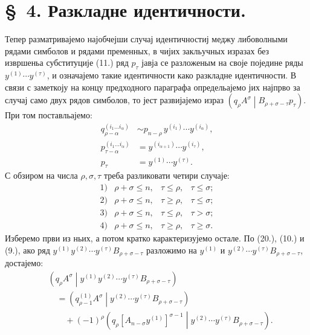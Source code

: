 \documentclass[11pt]{article}
\newcommand{\pair}[2]{\left(#1\middle|#2\right)}
\begin{document}
\section*{\S\ 4. Разкладне идентичности.}

Тепер разматривајемо најобчејши случај идентичностиј меджу либоволными рядами симболов и рядами пременных, в чијих закльучных изразах без извршеньа субституције (11.) ряд $p_\tau$ јавја се разложеным на своје поједине ряды $y^{(1)}\cdots y^{(\tau)}$, и означајемо такие идентичности како разкладне идентичности. В связи с заметкоју на концу предходного параграфа определьајемо јих најпрво за случај само двух рядов симболов, то јест развијајемо израз $\pair{q_\rho A^\sigma}{B_{\rho+\sigma-\tau}p_\tau}$. При том поставльајемо:
\begin{equation}
\begin{aligned}
q_{\rho-\alpha}^{(i_1\ldots i_\alpha)}
&\sim p_{n-\rho}\,y^{(i_1)}\cdots y^{(i_\alpha)},\\
p_{\tau-\alpha}^{(i_1\ldots i_\alpha)}
&=y^{(i_{\alpha+1})}\cdots y^{(i_\tau)},\\
p_\tau&=y^{(1)}\cdots y^{(\tau)}.
\end{aligned}
\tag{22}
\end{equation}
С обзиром на числа $\rho,\sigma,\tau$ треба разликовати четири случаје:
\[
\begin{array}{llll}
1)&\rho+\sigma\le n,& \tau\le\rho,& \tau\le\sigma;\\[2pt]
2)&\rho+\sigma\le n,& \tau\ge\rho,& \tau\le\sigma;\\[2pt]
3)&\rho+\sigma\le n,& \tau\le\rho,& \tau>\sigma;\\[2pt]
4)&\rho+\sigma\le n,& \tau\ge\rho,& \tau\ge\sigma.
\end{array}
\]
Изберемо први из ньих, а потом кратко карактеризујемо остале. По (20.), (10.) и (9.), ако ряд $y^{(1)}y^{(2)}\cdots y^{(\tau)}B_{\rho+\sigma-\tau}$ разложимо на $y^{(1)}$ и $y^{(2)}\cdots y^{(\tau)}B_{\rho+\sigma-\tau}$, достајемо:
\begin{equation}
\begin{aligned}
&\pair{q_\rho A^\sigma}{y^{(1)}y^{(2)}\cdots y^{(\tau)}
B_{\rho+\sigma-\tau}}\\
&\quad=\pair{q_{\rho-1}^{(1)}A^\sigma}
{y^{(2)}\cdots y^{(\tau)}B_{\rho+\sigma-\tau}}\\
&\qquad+(-1)^\rho
\pair{q_\rho[A_{n-\sigma}y^{(1)}]^{\sigma-1}}
{y^{(2)}\cdots y^{(\tau)}B_{\rho+\sigma-\tau}}.
\end{aligned}
\tag{23}
\end{equation}
\end{document}
